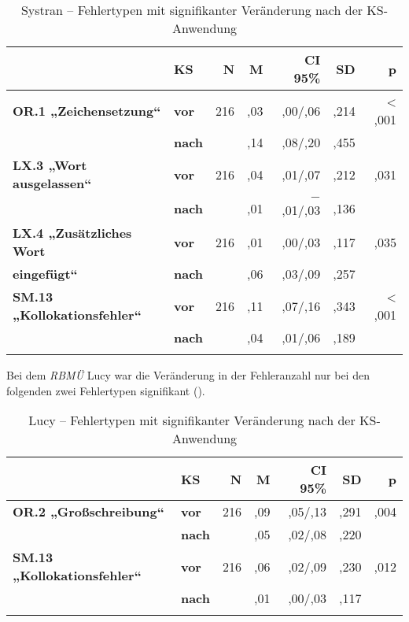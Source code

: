 \begin{table}
\begin{tabularx}{\textwidth}{llrrrrr}

\lsptoprule
& \textbf{KS} & \textbf{N} & \textbf{M} & \textbf{CI 95\%} & \textbf{SD} & \textbf{p}\\
 \midrule
\textbf{OR.1 „Zeichensetzung“} & \textbf{vor} & 216 & ,03 & ,00/,06 & ,214 & < ,001\\
& \textbf{nach} & & ,14 & ,08/,20 & ,455 & \\
\tablevspace
\textbf{LX.3 „Wort ausgelassen“} & \textbf{vor} & 216 & ,04 & ,01/,07 & ,212 & ,031\\
& \textbf{nach} & & ,01 & $-$ ,01/,03 & ,136 & \\
\tablevspace
\textbf{LX.4 „Zusätzliches Wort} & \textbf{vor} & 216 & ,01 & ,00/,03 & ,117 & ,035\\
\textbf{eingefügt“} & \textbf{nach} & & ,06 & ,03/,09 & ,257 & \\
\tablevspace
\textbf{SM.13 „Kollokationsfehler“} & \textbf{vor} & 216 & ,11 & ,07/,16 & ,343 & < ,001\\
& \textbf{nach} & & ,04 & ,01/,06 & ,189 & \\
\lspbottomrule
\end{tabularx}
\caption{\label{tab:05:94}Systran -- Fehlertypen mit signifikanter Veränderung nach der KS-Anwendung }
\end{table}

Bei dem \textit{RBMÜ} Lucy war die Veränderung in der Fehleranzahl nur bei den folgenden zwei Fehlertypen signifikant ().

\begin{table}
\begin{tabularx}{\textwidth}{llrrrrr}

\lsptoprule
& \textbf{KS} & \textbf{N} & \textbf{M} & \textbf{CI 95\%} & \textbf{SD} & \textbf{p}\\
 \midrule
\textbf{OR.2 „Großschreibung“} & \textbf{vor} & 216 & ,09 & ,05/,13 & ,291 & ,004\\
& \textbf{nach} & & ,05 & ,02/,08 & ,220 & \\
\tablevspace
\textbf{SM.13 „Kollokationsfehler“} & \textbf{vor} & 216 & ,06 & ,02/,09 & ,230 & ,012\\
& \textbf{nach} & & ,01 & ,00/,03 & ,117 & \\
\lspbottomrule
\end{tabularx}
\caption{\label{tab:05:95}Lucy -- Fehlertypen mit signifikanter Veränderung nach der KS-Anwendung }
\end{table}


